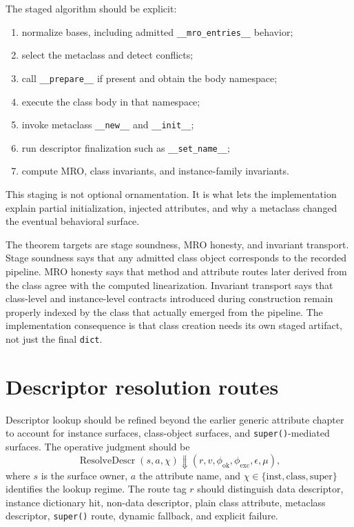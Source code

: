 \documentclass[11pt]{report}
\begin{document}
The staged algorithm should be explicit:
\begin{enumerate}
\item normalize bases, including admitted \texttt{\_\_mro\_entries\_\_} behavior;
\item select the metaclass and detect conflicts;
\item call \texttt{\_\_prepare\_\_} if present and obtain the body namespace;
\item execute the class body in that namespace;
\item invoke metaclass \texttt{\_\_new\_\_} and \texttt{\_\_init\_\_};
\item run descriptor finalization such as \texttt{\_\_set\_name\_\_};
\item compute MRO, class invariants, and instance-family invariants.
\end{enumerate}
This staging is not optional ornamentation. It is what lets the implementation explain partial initialization, injected attributes, and why a metaclass changed the eventual behavioral surface.

The theorem targets are stage soundness, MRO honesty, and invariant transport. Stage soundness says that any admitted class object corresponds to the recorded pipeline. MRO honesty says that method and attribute routes later derived from the class agree with the computed linearization. Invariant transport says that class-level and instance-level contracts introduced during construction remain properly indexed by the class that actually emerged from the pipeline. The implementation consequence is that class creation needs its own staged artifact, not just the final \texttt{dict}.
\section{Descriptor resolution routes}
Descriptor lookup should be refined beyond the earlier generic attribute chapter to account for instance surfaces, class-object surfaces, and \texttt{super()}-mediated surfaces. The operative judgment should be
\[
\operatorname{ResolveDescr}(s,a,\chi) \Downarrow (r,v,\phi_{\mathrm{ok}},\phi_{\mathrm{exc}},\epsilon,\mu),
\]
where $s$ is the surface owner, $a$ the attribute name, and $\chi\in\{\mathrm{inst},\mathrm{class},\mathrm{super}\}$ identifies the lookup regime. The route tag $r$ should distinguish data descriptor, instance dictionary hit, non-data descriptor, plain class attribute, metaclass descriptor, \texttt{super()} route, dynamic fallback, and explicit failure.
\end{document}
